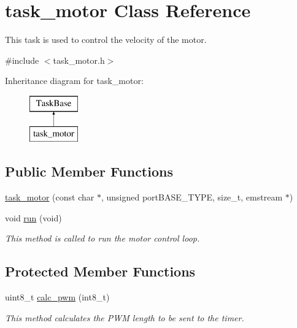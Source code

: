 \hypertarget{classtask__motor}{}\section{task\+\_\+motor Class Reference}
\label{classtask__motor}


This task is used to control the velocity of the motor.  




{\ttfamily \#include $<$task\+\_\+motor.\+h$>$}

Inheritance diagram for task\+\_\+motor\+:\begin{figure}[H]
\begin{center}
\leavevmode
\includegraphics[height=2.000000cm]{classtask__motor}
\end{center}
\end{figure}
\subsection*{Public Member Functions}
\begin{DoxyCompactItemize}
\item 
\mbox{\hyperlink{classtask__motor_a6ed0a0b463e698d636b28bcdd518a027}{task\+\_\+motor}} (const char $\ast$, unsigned port\+B\+A\+S\+E\+\_\+\+T\+Y\+PE, size\+\_\+t, emstream $\ast$)
\item 
void \mbox{\hyperlink{classtask__motor_a895a075ec470c9d5a07b8959de06aacd}{run}} (void)
\begin{DoxyCompactList}\small\item\em This method is called to run the motor control loop. \end{DoxyCompactList}\end{DoxyCompactItemize}
\subsection*{Protected Member Functions}
\begin{DoxyCompactItemize}
\item 
uint8\+\_\+t \mbox{\hyperlink{classtask__motor_a6022366bdc25c0a1c16b96bbc02bcffa}{calc\+\_\+pwm}} (int8\+\_\+t)
\begin{DoxyCompactList}\small\item\em This method calculates the P\+WM length to be sent to the timer. \end{DoxyCompactList}\end{DoxyCompactItemize}
